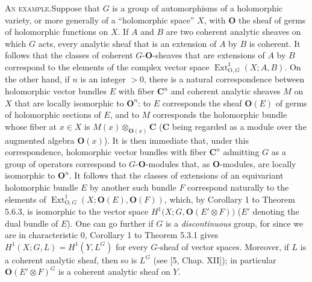 \clearpage
{}

\textsc{An example.}\quad Suppose that $G$ is a group of
automorphisms of a holomorphic variety, or more generally of a ``holomorphic
space'' $X$, with ${\mathbf O}$ the sheaf of germs of holomorphic functions on $X$.
If $A$ and $B$ are two coherent analytic sheaves on which $G$ acts, every
analytic sheaf that is an extension of $A$ by $B$ is coherent. It follows that
the classes of coherent $G$-${\mathbf O}$-sheaves that are extensions of $A$ by $B$
correspond to the elements of the complex vector space
$\operatorname{Ext}_{{\mathrm O},G}^{1}(X;A,B)$.
On the other hand, if $n$ is an integer $>0$, there is a natural
correspondence between holomorphic vector bundles $E$ with fiber
$\mathbf C^n$ and coherent analytic sheaves $M$ on $X$ that are locally
isomorphic to ${\mathbf O}^n$: to $E$ corresponds the sheaf ${\mathbf O}(E)$ of germs of
holomorphic sections of $E$, and to $M$ corresponds the holomorphic bundle
whose fiber at $x\in X$ is $M(x)\otimes_{{\mathbf O}(x)}\mathbf C$ ($\mathbf C$ being
regarded as a module over the augmented algebra ${\mathbf O}(x)$).
It is then immediate that, under this correspondence, holomorphic vector
bundles with fiber $\mathbf C^n$ admitting $G$ as a group of operators
correspond to $G$-${\mathbf O}$-modules that, as ${\mathbf O}$-modules, are locally isomorphic to
${\mathbf O}^n$.
It follows that the classes of extensions of an equivariant holomorphic
bundle $E$ by another such bundle $F$ correspond naturally to the elements of
$\operatorname{Ext}_{{\mathrm O},G}^{1}(X;{\mathbf O}(E),{\mathbf O}(F))$, which, by Corollary 1 to Theorem
5.6.3, is isomorphic to the vector space
$H^1\bigl(X;G,{\mathbf O}(E'\otimes F)\bigr)$
($E'$ denoting the dual bundle of $E$).
One can go further if $G$ is a \textit{discontinuous} group, for since we are
in characteristic 0, Corollary 1 to Theorem 5.3.1 gives
$H^1(X;G,L)=H^1(Y,L^G)$ for every $G$-sheaf of vector spaces. Moreover, if
$L$ is a coherent analytic sheaf, then so is $L^G$ (see [5, Chap. XII]); in
particular ${\mathbf O}(E'\otimes F)^G$ is a coherent analytic sheaf on $Y$.
